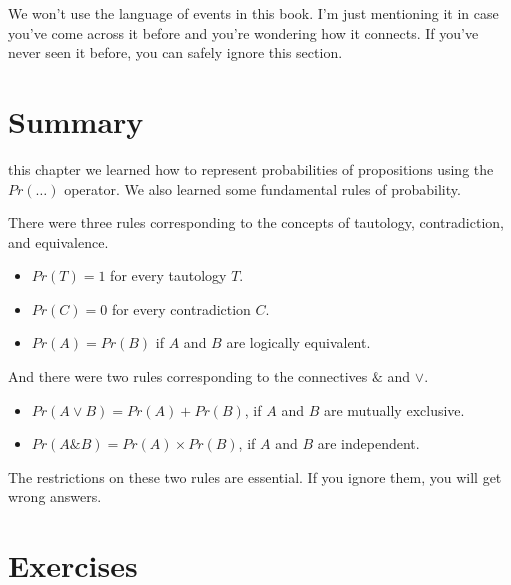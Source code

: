 \documentclass[justified]{tufte-book}
\providecommand{\tightlist}{%
  \setlength{\itemsep}{0pt}\setlength{\parskip}{0pt}}
\renewcommand{\wedge}{\mathbin{\&}}
\newcommand{\p}{Pr}
\theoremstyle{definition}
\theoremstyle{definition}
\theoremstyle{definition}
\theoremstyle{remark}
\begin{document}
We won't use the language of events in this book. I'm just mentioning it
in case you've come across it before and you're wondering how it
connects. If you've never seen it before, you can safely ignore this
section.

\hypertarget{summary-1}{%
\section{Summary}\label{summary-1}}

 this chapter we learned how to represent probabilities
of propositions using the \(Pr(\ldots)\) operator. We also learned some
fundamental rules of probability.

There were three rules corresponding to the concepts of tautology,
contradiction, and equivalence.

\begin{itemize}
\tightlist
\item
  \(\p(T) = 1\) for every tautology \(T\).
\item
  \(\p(C) = 0\) for every contradiction \(C\).
\item
  \(\p(A) = \p(B)\) if \(A\) and \(B\) are logically equivalent.
\end{itemize}

And there were two rules corresponding to the connectives \(\wedge\) and
\(\vee\).

\begin{itemize}
\tightlist
\item
  \(Pr(A \vee B) = Pr(A) + Pr(B)\), if \(A\) and \(B\) are mutually
  exclusive.
\item
  \(Pr(A \wedge B) = Pr(A) \times Pr(B)\), if \(A\) and \(B\) are
  independent.
\end{itemize}

The restrictions on these two rules are essential. If you ignore them,
you will get wrong answers.

\hypertarget{exercises-4}{%
\section*{Exercises}\label{exercises-4}}
\end{document}
